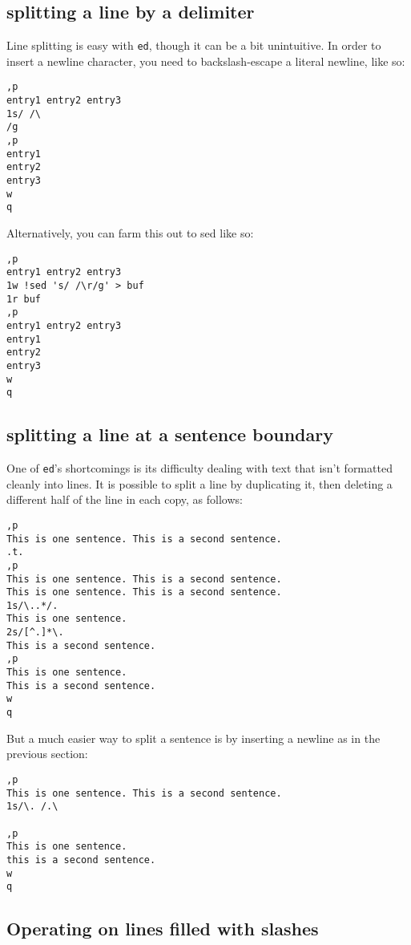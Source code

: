 \documentclass[12pt]{article}
\begin{document}
\subsection{splitting a line by a delimiter}

Line splitting is easy with \lstinline{ed}, though it can be a bit unintuitive.
In order to insert a newline character, you need to backslash-escape a literal newline, like so:

\begin{lstlisting}
,p
entry1 entry2 entry3
1s/ /\
/g
,p
entry1
entry2
entry3
w
q
\end{lstlisting}

Alternatively, you can farm this out to sed like so:

\begin{lstlisting}
,p
entry1 entry2 entry3
1w !sed 's/ /\r/g' > buf
1r buf
,p
entry1 entry2 entry3
entry1
entry2
entry3
w
q
\end{lstlisting}

\subsection{splitting a line at a sentence boundary}

One of \lstinline{ed}'s shortcomings is its difficulty dealing with text that isn't
formatted cleanly into lines. It is possible
to split a line by duplicating it, then deleting a different half of the line in each copy, as follows:

\begin{lstlisting}
,p
This is one sentence. This is a second sentence.
.t.
,p
This is one sentence. This is a second sentence.
This is one sentence. This is a second sentence.
1s/\..*/.
This is one sentence.
2s/[^.]*\. 
This is a second sentence.
,p
This is one sentence.
This is a second sentence.
w
q
\end{lstlisting}

But a much easier way to split a sentence is by inserting a newline as in the previous section:

\begin{lstlisting}
,p
This is one sentence. This is a second sentence.
1s/\. /.\

,p
This is one sentence.
this is a second sentence.
w
q
\end{lstlisting}

\subsection{Operating on lines filled with slashes}
\end{document}
